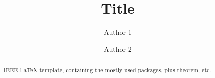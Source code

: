 \documentclass[conference]{IEEEtran}
\begin{document}
\title{\huge Title}


\author{Author 1}
\author{Author 2}

\maketitle


\begin{abstract}

IEEE LaTeX template, containing the mostly used packages, plus theorem, etc.

\end{abstract}
\IEEEpeerreviewmaketitle







\end{document}

